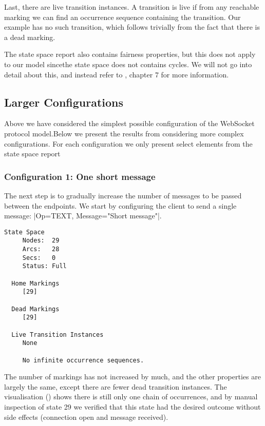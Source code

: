 	Last, there are live transition instances. A transition is live if from any
	reachable marking we can find an occurrence sequence containing the transition.
	Our example has no such transition, which follows trivially from the fact that
	there is a dead marking.

	The state space report also contains fairness properties, but this does
	not apply to our model sincethe state space does not contains cycles. We
	will not go into detail about this, and instead refer to \cite{cpn_book},
	chapter 7 for more information.
	
\subsection{Larger Configurations} 
	Above we have considered the simplest possible configuration of the WebSocket
	protocol model.Below we present the results from considering more complex
	configurations. For each configuration we only present select elements from the
	state space report

	\subsubsection{Configuration 1: One short message}
	The next step is to gradually increase the number of messages to be passed
	between the endpoints. We start by configuring the client to send a single
	message: |{Op=TEXT, Message="Short message"}|. 
	
	\begin{lstlisting}[language={},float,caption=One message]
  State Space
     Nodes:  29
     Arcs:   28
     Secs:   0
     Status: Full

  Home Markings
     [29]

  Dead Markings
     [29]

  Live Transition Instances
     None

     No infinite occurrence sequences.
	\end{lstlisting}
	
	The number of markings has not increased by much, and the other properties are
	largely the same, except there are fewer dead transition instances. 
	The visualisation () shows there is still only one
	chain of occurrences, and by manual inspection of state 29 we verified that
	this state had the desired outcome without side effects (connection open and
	message received).
	
